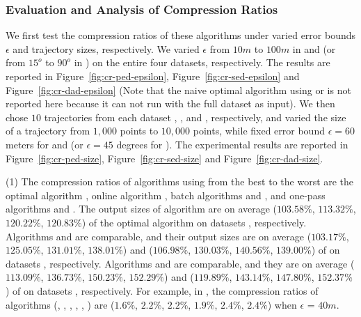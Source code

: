 \vspace{-1ex}
\subsubsection{Evaluation and Analysis of Compression Ratios}

We first test the compression ratios of these algorithms under varied error bounds $\epsilon$ and trajectory sizes, respectively. We varied $\epsilon$ from $10m$ to $100m$ in \ped and \sed (or from $15^o$ to $90^o$ in \dad) on the entire four datasets, respectively. The results are reported in Figure~\ref{fig:cr-ped-epsilon}, Figure~\ref{fig:cr-sed-epsilon} and Figure~\ref{fig:cr-dad-epsilon} ({Note that the naive optimal algorithm using \sed or \dad is not reported here because it can not run with the full dataset as input}).
%
We then chose $10$ trajectories from each dataset \taxi, \ucar, \geolife and \mopsi, respectively, and varied the size  of a trajectory from $1,000$ points to $10,000$ points, while fixed error bound $\epsilon = 60$ meters for \ped and \sed ({or $\epsilon = 45$ degrees for \dad}).
The experimental results are reported in Figure~\ref{fig:cr-ped-size}, Figure~\ref{fig:cr-sed-size} and Figure~\ref{fig:cr-dad-size}. 

(1) The compression ratios of algorithms using \ped from the best
to the worst are the optimal algorithm \opt, online algorithm \bqsa, batch algorithms \tpa and
\dpa, and one-pass algorithms \siped and \operb.
The output sizes of algorithm \bqsa are on average
($103.58\%$, $113.32\%$, $120.22\%$, $120.83\%$) of the optimal algorithm \opt
on datasets \dSets, respectively.
Algorithms \tpa and \dpa are comparable, and their output sizes are on average
($103.17\%$, $125.05\%$, $131.01\%$, $138.01\%$) and ($106.98\%$, $130.03\%$, $140.56\%$, $139.00\%$) of \opt
on datasets \dSets, respectively.
Algorithms \siped and \operb are comparable, and they are on average
($113.09\%$, $136.73\%$, $150.23\%$, $152.29\%$)
and ($119.89\%$, $143.14\%$, $147.80\%$, $152.37\%$) of \opt on datasets \dSets, respectively.
%
For example, in \mopsi, the compression ratios of algorithms
(\opt, \tpa, \dpa, \bqsa, \siped, \operb ) are ($1.6\%$, $2.2\%$, $2.2\%$, $1.9\%$, $2.4\%$, $2.4\%$) when $\epsilon$ = $40m$.
%

